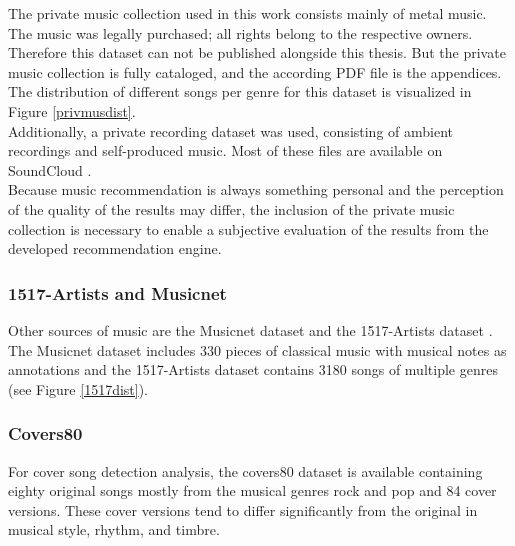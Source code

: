 The private music collection used in this work consists mainly of metal music. The music was legally purchased; all rights belong to the respective owners. Therefore this dataset can not be published alongside this thesis. But the private music collection is fully cataloged, and the according PDF file is the appendices. The distribution of different songs per genre for this dataset is visualized in Figure \ref{privmusdist}.\\
\noindent Additionally, a private recording dataset was used, consisting of ambient recordings and self-produced music. Most of these files are available on SoundCloud \cite{bqpd1}.\\
Because music recommendation is always something personal and the perception of the quality of the results may differ, the inclusion of the private music collection is necessary to enable a subjective evaluation of the results from the developed recommendation engine.

\subsubsection{1517-Artists and Musicnet}

Other sources of music are the Musicnet dataset \cite{musicnet1} and the 1517-Artists dataset \cite{1517artists1}. The Musicnet dataset includes 330 pieces of classical music with musical notes as annotations and the 1517-Artists dataset contains 3180 songs of multiple genres (see Figure \ref{1517dist}). 

\subsubsection{Covers80}\label{cov801}

For cover song detection analysis, the covers80 dataset is available \cite{cover80} containing eighty original songs mostly from the musical genres rock and pop and 84 cover versions. These cover versions tend to differ significantly from the original in musical style, rhythm, and timbre.\\

